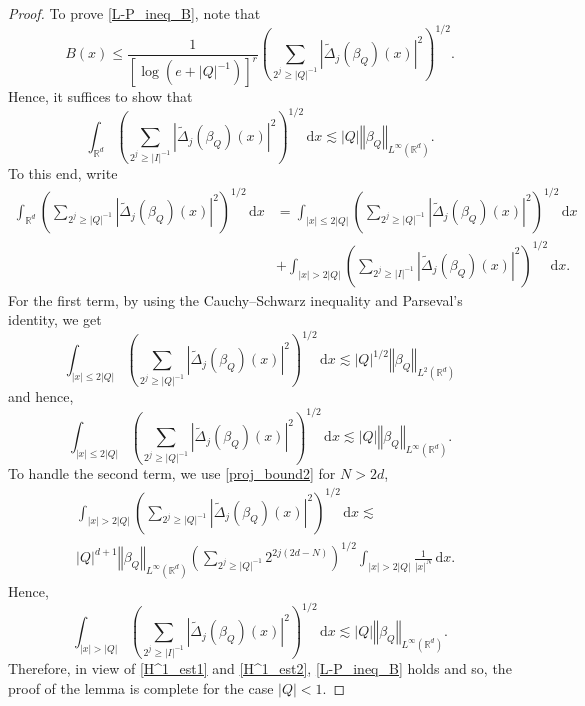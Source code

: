\documentclass[a4paper, leqno, 10pt]{amsart}
\numberwithin{equation}{section}
\newcommand{\dd}{\mathrm{d}}
\newcommand{\R}{\mathbb{R}}
\newcommand{\norm}[1]{\left\Vert#1\right\Vert}
\newcommand{\brkt}[1]{\left(#1\right)}
\newcommand{\abs}[1]{\left|#1\right|}
\begin{document}
\begin{proof}
To prove \eqref{L-P_ineq_B}, note that
\[
B (x) \leq \frac{1}{\left[ \log (e+|Q|^{-1}) \right]^r} \left( \sum_{2^j \geq |Q|^{-1} }  | \widetilde{\Delta}_j (\beta_Q) (x)  |^2 \right)^{1/2} . 
\]
Hence, it suffices to show that
\begin{equation}\label{H^1_est}
\int_{\R^d} \left( \sum_{2^j \geq | I  |^{-1} } | \widetilde{\Delta}_j (\beta_Q) (x)  |^2 \right)^{1/2} \, \dd x \lesssim |Q| \norm{ \beta_Q }_{L^{\infty} (\R^d)}. 
\end{equation}
To this end, write
\begin{align*}
\int_{\R^d} \left( \sum_{2^j \geq | Q  |^{-1} }  | \widetilde{\Delta}_j (\beta_Q) (x)  |^2 \right)^{1/2} \, \dd x &= \int_{|x| \leq 2| Q |} \left( \sum_{2^j \geq | Q  |^{-1} }  | \widetilde{\Delta}_j (\beta_Q) (x)  |^2 \right)^{1/2}\, \dd x \\
&+ \int_{|x| > 2| Q |} \left( \sum_{2^j \geq | I  |^{-1} }  | \widetilde{\Delta}_j (\beta_Q) (x)  |^2 \right)^{1/2} \, \dd x.
\end{align*}
For the first term, by using the Cauchy--Schwarz inequality and Parseval's identity, we get
\[
\int_{|x| \leq 2| Q |} \left( \sum_{2^j \geq |Q|^{-1} }  | \widetilde{\Delta}_j (\beta_Q) (x)  |^2 \right)^{1/2} \, \dd x \lesssim |Q|^{1/2} \norm{\beta_Q}_{L^2 (\R^d)}
\]
and hence,
\begin{equation}\label{H^1_est1}
\int_{| x| \leq 2| Q |} \left( \sum_{2^j \geq |Q|^{-1} }  | \widetilde{\Delta}_j (\beta_Q) (x)  |^2 \right)^{1/2} \, \dd x \lesssim |Q| \norm{\beta_Q}_{L^{\infty} (\R^d)}. 
\end{equation}
To handle the second term, we use \eqref{proj_bound2} for $N>2d$,
\begin{align*}
& \int_{| x| > 2| Q |} \left( \sum_{2^j \geq |Q|^{-1} }  | \widetilde{\Delta}_j (\beta_Q) (x)  |^2 \right)^{1/2} \, \dd x \lesssim \\
&  |Q|^{d+1} \norm{\beta_Q}_{L^{\infty} (\R^d)} \brkt{ \sum_{2^j \geq |Q|^{-1}} 2^{2j(2d-N)} }^{1/2} \int_{| x| > 2|Q|} \frac{1}{| x|^N} \, \dd x. 
\end{align*}
Hence,
\begin{equation}\label{H^1_est2}
\int_{| x| > | Q |} \left( \sum_{2^j \geq | I  |^{-1} }  | \widetilde{\Delta}_j (\beta_Q) (x)  |^2 \right)^{1/2} \, \dd  x \lesssim |Q| \norm{\beta_Q}_{L^{\infty} (\R^d)}. 
\end{equation}
Therefore, in view of \eqref{H^1_est1} and \eqref{H^1_est2},
\eqref{L-P_ineq_B}  holds and so, the proof of the lemma is complete for the case $\abs{Q}<1$.
	

\end{proof}
\end{document}
